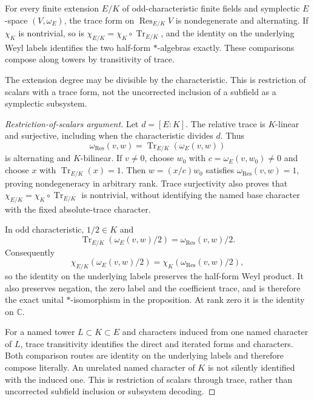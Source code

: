 \begin{proposition}
\statusProved{}
For every finite extension $E/K$ of odd-characteristic finite fields and symplectic
$E$-space $(V,\omega_E)$, the trace form on $\operatorname{Res}_{E/K}V$ is
nondegenerate and alternating. If $\chi_K$ is nontrivial, so is
$\chi_{E/K}=\chi_K\circ\operatorname{Tr}_{E/K}$, and the identity on the underlying
Weyl labels identifies the two half-form $*$-algebras exactly. These comparisons
compose along towers by transitivity of trace.
\end{proposition}
\begin{scope}
The extension degree may be divisible by the characteristic. This is restriction of scalars with a trace form, not the uncorrected inclusion of a subfield as a symplectic subsystem.
\end{scope}

\begin{proof}[Restriction-of-scalars argument]
Let $d=[E:K]$. The relative trace is $K$-linear and surjective, including
when the characteristic divides $d$. Thus
\[
 \omega_{\mathrm{Res}}(v,w)
 =\operatorname{Tr}_{E/K}(\omega_E(v,w))
\]
is alternating and $K$-bilinear. If $v\ne0$, choose $w_0$ with
$c=\omega_E(v,w_0)\ne0$ and choose $x$ with
$\operatorname{Tr}_{E/K}(x)=1$. Then
$w=(x/c)w_0$ satisfies $\omega_{\mathrm{Res}}(v,w)=1$, proving
nondegeneracy in arbitrary rank. Trace surjectivity also proves that
$\chi_{E/K}=\chi_K\circ\operatorname{Tr}_{E/K}$ is nontrivial, without
identifying the named base character with the fixed absolute-trace character.

In odd characteristic, $1/2\in K$ and
\[
 \operatorname{Tr}_{E/K}(\omega_E(v,w)/2)
 =\omega_{\mathrm{Res}}(v,w)/2.
\]
Consequently
\[
 \chi_{E/K}(\omega_E(v,w)/2)
 =\chi_K(\omega_{\mathrm{Res}}(v,w)/2),
\]
so the identity on the underlying labels preserves the half-form Weyl
product. It also preserves negation, the zero label and the coefficient
trace, and is therefore the exact unital $*$-isomorphism in the proposition.
At rank zero it is the identity on $\mathbb C$.

For a named tower $L\subset K\subset E$ and characters induced from one
named character of $L$, trace transitivity identifies the direct and
iterated forms and characters. Both comparison routes are identity on the
underlying labels and therefore compose literally. An unrelated named
character of $K$ is not silently identified with the induced one. This is
restriction of scalars through trace, rather than uncorrected subfield
inclusion or subsystem decoding.
\end{proof}

